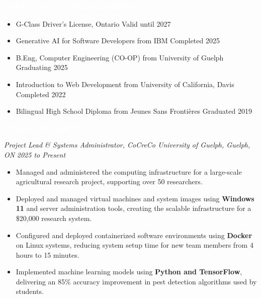 \documentclass[9pt]{src/developercv}
\begin{document}
  \vspace{\baselineskip}
  \colorbox{sky900}{\textcolor{white}{\LARGE\MakeUppercase{\textbf{Education \& Certifications}}}}
  \begin{itemize}[leftmargin=2em, itemsep=0.1em]
    \item G-Class Driver's License, Ontario \hfill Valid until 2027
    \item Generative AI for Software Developers from IBM \hfill Completed 2025
    \item B.Eng, Computer Engineering (CO-OP) from University of Guelph
    \hfill Graduating 2025
    \item Introduction to Web Development from University of California, Davis
    \hfill Completed 2022
    \item Bilingual High School Diploma from Jeunes Sans Frontières
    \hfill Graduated 2019
  \end{itemize}

  \vspace{\baselineskip}
  \colorbox{sky900}{\textcolor{white}{\LARGE\MakeUppercase{\textbf{Work Experience}}}}
  
  \vspace{1.0\baselineskip}

  \textit{Project Lead \& Systems Administrator, CoCreCo University of Guelph,
  Guelph, ON} \hfill \textit{2025 to Present}
  \begin{itemize}[leftmargin=2em, itemsep=0.1em]
    \item Managed and administered the computing infrastructure for a large-scale
    agricultural research project, supporting over 50 researchers.
    \item Deployed and managed virtual machines and system images using
    \textbf{Windows 11} and server administration tools, creating the scalable
    infrastructure for a \$20,000 research system.
    \item Configured and deployed containerized software environments using
    \textbf{Docker} on Linux systems, reducing system setup time for new team
    members from 4 hours to 15 minutes.
    \item Implemented machine learning models using \textbf{Python and
    TensorFlow}, delivering an 85\% accuracy improvement in pest detection
    algorithms used by students.
  \end{itemize}
\end{document}
